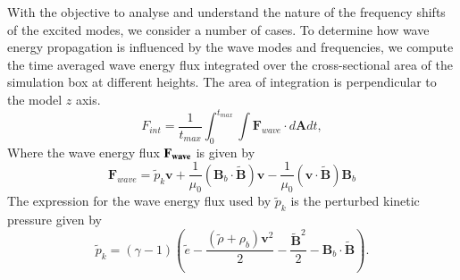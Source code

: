 \documentclass[preprint,authoryear,12pt]{elsarticle}
\begin{document}
With the objective to analyse and understand the nature of the frequency shifts of the excited modes, we consider a number of cases.  To determine how wave energy propagation is influenced by the wave modes and frequencies, we compute the time averaged wave energy flux integrated over the cross-sectional area of the simulation box at different heights. The area of integration is perpendicular to the model $z$ axis.
\begin{equation}
F_{int}= \frac{1}{t_{max}} \int_{0}^{t_{max}} \int {\mathbf F}_{wave} \cdot d{\mathbf A}dt,
\label{e11}
\end{equation}
Where the wave energy flux $\bf{F}_{wave}$ is given by
$$
{\mathbf F}_{wave}=\tilde{p}_{k} {\mathbf v}+\frac{1}{\mu_{0}}\left({\mathbf B}_{b}\cdot \tilde{{\mathbf B}}\right){\mathbf v}-\frac{1}{\mu_{0}}
\left({\mathbf v}\cdot \tilde{\mathbf B}\right){\mathbf B}_{b}
$$
The expression for the wave energy flux used by $\tilde{p}_{k}$ is the perturbed kinetic pressure given by \citet{Bogdan2003}
$$
\tilde{p}_{k}=\left(\gamma - 1\right)\left( \tilde{e}-\frac{ \left( \tilde{\rho} +\rho_b \right){\mathbf v}^2}{2}-\frac{{\tilde {\mathbf B}}^2}{2}-{\mathbf B}_b \cdot  \tilde{\mathbf B}\right).
$$
\end{document}
